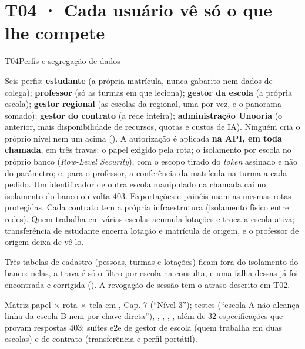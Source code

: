 \section{T04 · Cada usuário vê só o que lhe compete}
\label{sec:t04}

\begin{resposta}{T04}{Perfis e segregação de dados}{\implementado}
\begin{campos}
  \item[Hoje] Seis perfis: \textbf{estudante} (a própria matrícula, nunca
    gabarito nem dados de colega); \textbf{professor} (só as turmas em que
    leciona); \textbf{gestor da escola} (a própria escola);
    \textbf{gestor regional} (as escolas da regional, uma por vez, e o
    panorama somado); \textbf{gestor do contrato} (a rede inteira);
    \textbf{administração Unooria} (o anterior, mais disponibilidade de
    recursos, quotas e custos de IA). Ninguém cria o próprio nível nem um
    acima (). A autorização é aplicada \textbf{na API, em toda
    chamada}, em três travas: o papel exigido pela rota; o isolamento por
    escola no próprio banco (\emph{Row-Level Security}), com o escopo tirado
    do \emph{token} assinado e não do parâmetro; e, para o professor, a
    conferência da matrícula na turma a cada pedido. Um identificador de
    outra escola manipulado na chamada cai no isolamento do banco ou volta
    403. Exportações e painéis usam as mesmas rotas protegidas. Cada contrato
    tem a própria infraestrutura (isolamento físico entre redes). Quem
    trabalha em várias escolas acumula lotações e troca a escola ativa;
    transferência de estudante encerra lotação e matrícula de origem, e o
    professor de origem deixa de vê-lo.
  \item[Limitações] Três tabelas de cadastro (pessoas, turmas e lotações)
    ficam fora do isolamento do banco: nelas, a trava é só o filtro por escola
    na consulta, e uma falha dessas já foi encontrada e corrigida
    (). A revogação de sessão tem o atraso descrito em T02.
  \item[Evidência] Matriz papel $\times$ rota $\times$ tela em ,
    Cap. 7 (``Nível 3''); testes  (``escola A não alcança
    linha da escola B nem por chave direta''), ,
    , ,
    , além de 32 especificações que
    provam respostas 403; suítes e2e de gestor de escola (quem trabalha em
    duas escolas) e de contrato (transferência e perfil portátil).
\end{campos}
\end{resposta}

